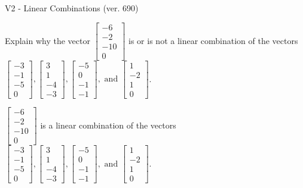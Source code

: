 \begin{exercise}
  \begin{exerciseTitle}V2 - Linear Combinations (ver. 690)\end{exerciseTitle}
  \begin{exerciseStatement}
    Explain why the vector \(\left[\begin{array}{c}
-6 \\
-2 \\
-10 \\
0
\end{array}\right]\)  is or is not a linear 
	combination of the vectors \(\left[\begin{array}{c}
-3 \\
-1 \\
-5 \\
0
\end{array}\right] , \left[\begin{array}{c}
3 \\
1 \\
-4 \\
-3
\end{array}\right] , \left[\begin{array}{c}
-5 \\
0 \\
-1 \\
-1
\end{array}\right] , \text{ and } \left[\begin{array}{c}
1 \\
-2 \\
1 \\
0
\end{array}\right]\).
	


  \end{exerciseStatement}
  \begin{exerciseAnswer}
   \(\left[\begin{array}{c}
-6 \\
-2 \\
-10 \\
0
\end{array}\right]\) 
  	 is  
	a linear combination of the vectors \(\left[\begin{array}{c}
-3 \\
-1 \\
-5 \\
0
\end{array}\right] , \left[\begin{array}{c}
3 \\
1 \\
-4 \\
-3
\end{array}\right] , \left[\begin{array}{c}
-5 \\
0 \\
-1 \\
-1
\end{array}\right] , \text{ and } \left[\begin{array}{c}
1 \\
-2 \\
1 \\
0
\end{array}\right]\).


\end{exerciseAnswer}
\end{exercise}
